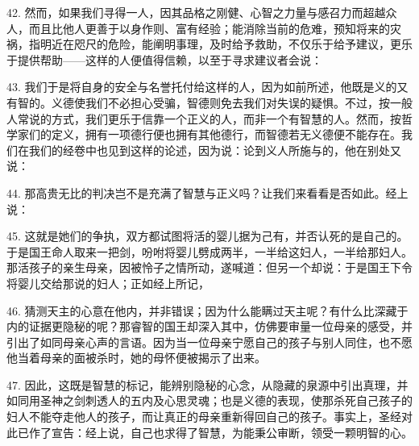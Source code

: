 42. 然而，如果我们寻得一人，因其品格之刚健、心智之力量与感召力而超越众人，而且比他人更善于以身作则、富有经验；能消除当前的危难，预知将来的灾祸，指明近在咫尺的危险，能阐明事理，及时给予救助，不仅乐于给予建议，更乐于提供帮助——这样的人便值得信赖，以至于寻求建议者会说：\par

43. 我们于是将自身的安全与名誉托付给这样的人，因为如前所述，他既是义的又有智的。义德使我们不必担心受骗，智德则免去我们对失误的疑惧。不过，按一般人常说的方式，我们更乐于信靠一个正义的人，而非一个有智慧的人。然而，按哲学家们的定义，拥有一项德行便也拥有其他德行，而智德若无义德便不能存在。我们在我们的经卷中也见到这样的论述，因为说：论到义人所施与的，他在别处又说：\par

44. 那高贵无比的判决岂不是充满了智慧与正义吗？让我们来看看是否如此。经上说：\par

45. 这就是她们的争执，双方都试图将活的婴儿据为己有，并否认死的是自己的。于是国王命人取来一把剑，吩咐将婴儿劈成两半，一半给这妇人，一半给那妇人。那活孩子的亲生母亲，因被怜子之情所动，遂喊道：但另一个却说：于是国王下令将婴儿交给那说的妇人；正如经上所记，\par

46. 猜测天主的心意在他内，并非错误；因为什么能瞒过天主呢？有什么比深藏于内的证据更隐秘的呢？那睿智的国王却深入其中，仿佛要审量一位母亲的感受，并引出了如同母亲心声的言语。因为当一位母亲宁愿自己的孩子与别人同住，也不愿他当着母亲的面被杀时，她的母怀便被揭示了出来。\par

47. 因此，这既是智慧的标记，能辨别隐秘的心念，从隐藏的泉源中引出真理，并如同用圣神之剑刺透人的五内及心思灵魂；也是义德的表现，使那杀死自己孩子的妇人不能夺走他人的孩子，而让真正的母亲重新得回自己的孩子。事实上，圣经对此已作了宣告：经上说，自己也求得了智慧，为能秉公审断，领受一颗明智的心。\par

